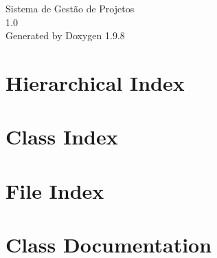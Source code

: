 \documentclass[twoside]{book}
\newcommand{\+}{\discretionary{\mbox{\scriptsize$\hookleftarrow$}}{}{}}
\newcommand{\clearemptydoublepage}{%
    \newpage{\pagestyle{empty}\cleardoublepage}%
  }
\begin{document}
  \raggedbottom
    \hypersetup{pageanchor=false,
                bookmarksnumbered=true,
                pdfencoding=unicode
               }
  \begin{titlepage}
  \vspace*{7cm}
  \begin{center}%
  {\Large Sistema de Gestão de Projetos}\\
  [1ex]\large 1.\+0 \\
  \vspace*{1cm}
  {\large Generated by Doxygen 1.9.8}\\
  \end{center}
  \end{titlepage}
  \clearemptydoublepage
  \tableofcontents
  \clearemptydoublepage
  \hypersetup{pageanchor=true}
\chapter{Hierarchical Index}

\chapter{Class Index}

\chapter{File Index}

\chapter{Class Documentation}




































\end{document}
